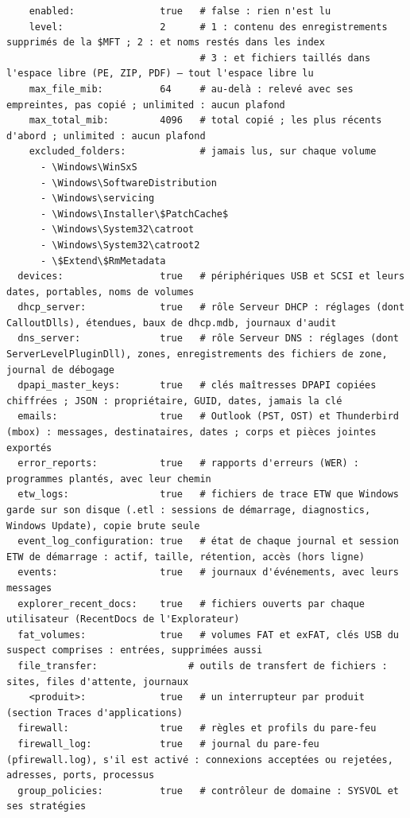 \documentclass[11pt,a4paper,oneside]{report}
\begin{document}
\begin{lstlisting}
    enabled:               true   # false : rien n'est lu
    level:                 2      # 1 : contenu des enregistrements supprimés de la $MFT ; 2 : et noms restés dans les index
                                  # 3 : et fichiers taillés dans l'espace libre (PE, ZIP, PDF) — tout l'espace libre lu
    max_file_mib:          64     # au-delà : relevé avec ses empreintes, pas copié ; unlimited : aucun plafond
    max_total_mib:         4096   # total copié ; les plus récents d'abord ; unlimited : aucun plafond
    excluded_folders:             # jamais lus, sur chaque volume
      - \Windows\WinSxS
      - \Windows\SoftwareDistribution
      - \Windows\servicing
      - \Windows\Installer\$PatchCache$
      - \Windows\System32\catroot
      - \Windows\System32\catroot2
      - \$Extend\$RmMetadata
  devices:                 true   # périphériques USB et SCSI et leurs dates, portables, noms de volumes
  dhcp_server:             true   # rôle Serveur DHCP : réglages (dont CalloutDlls), étendues, baux de dhcp.mdb, journaux d'audit
  dns_server:              true   # rôle Serveur DNS : réglages (dont ServerLevelPluginDll), zones, enregistrements des fichiers de zone, journal de débogage
  dpapi_master_keys:       true   # clés maîtresses DPAPI copiées chiffrées ; JSON : propriétaire, GUID, dates, jamais la clé
  emails:                  true   # Outlook (PST, OST) et Thunderbird (mbox) : messages, destinataires, dates ; corps et pièces jointes exportés
  error_reports:           true   # rapports d'erreurs (WER) : programmes plantés, avec leur chemin
  etw_logs:                true   # fichiers de trace ETW que Windows garde sur son disque (.etl : sessions de démarrage, diagnostics, Windows Update), copie brute seule
  event_log_configuration: true   # état de chaque journal et session ETW de démarrage : actif, taille, rétention, accès (hors ligne)
  events:                  true   # journaux d'événements, avec leurs messages
  explorer_recent_docs:    true   # fichiers ouverts par chaque utilisateur (RecentDocs de l'Explorateur)
  fat_volumes:             true   # volumes FAT et exFAT, clés USB du suspect comprises : entrées, supprimées aussi
  file_transfer:                # outils de transfert de fichiers : sites, files d'attente, journaux
    <produit>:             true   # un interrupteur par produit (section Traces d'applications)
  firewall:                true   # règles et profils du pare-feu
  firewall_log:            true   # journal du pare-feu (pfirewall.log), s'il est activé : connexions acceptées ou rejetées, adresses, ports, processus
  group_policies:          true   # contrôleur de domaine : SYSVOL et ses stratégies

\end{lstlisting}
\end{document}
